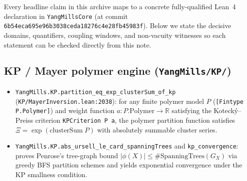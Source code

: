 \documentclass[11pt]{article}
\begin{document}
Every headline claim in this archive maps to a concrete fully-qualified Lean~4 declaration
in \texttt{YangMillsCore} (at commit \texttt{6b54eca695e96b3038ceda18276c4e28fb45983f}).
Below we state the decisive domains, quantifiers, coupling windows, and non-vacuity
witnesses so each statement can be checked directly from this note.

\subsection{KP / Mayer polymer engine (\texttt{YangMills/KP/})}
\begin{itemize}
  \item \texttt{YangMills.KP.partition\_eq\_exp\_clusterSum\_of\_kp}
  (\texttt{KP/MayerInversion.lean:2038}): for any finite polymer model $P$
  (\texttt{[Fintype P.Polymer]}) and weight function $a : P.\mathrm{Polymer} \to \mathbb{R}$
  satisfying the Koteck\'y--Preiss criterion \texttt{KPCriterion P a}, the polymer
  partition function satisfies $\Xi = \exp(\mathrm{clusterSum}\;P)$ with absolutely
  summable cluster series.
  \item \texttt{YangMills.KP.abs\_ursell\_le\_card\_spanningTrees} and
  \texttt{kp\_convergence}: proves Penrose's tree-graph bound
  $|\phi(X)| \le \#\mathrm{SpanningTrees}(G_X)$ via greedy BFS partition schemes and
  yields exponential convergence under the KP smallness condition.
\end{itemize}
\end{document}
